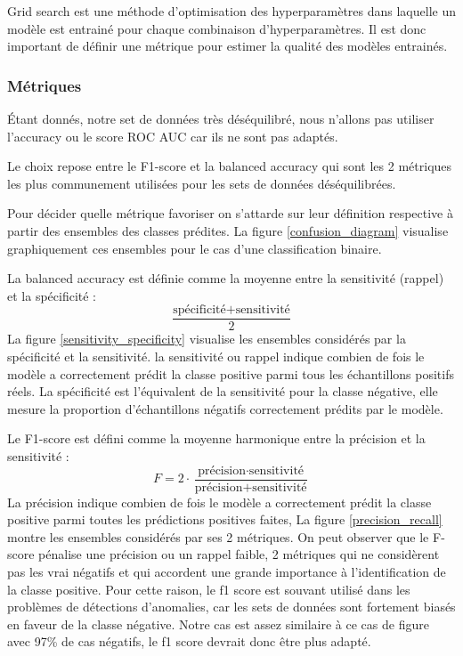 Grid search est une méthode d'optimisation des hyperparamètres dans laquelle un modèle est entrainé pour chaque combinaison d'hyperparamètres.
Il est donc important de définir une métrique pour estimer la qualité des modèles entrainés.
\subsubsection{Métriques}
Étant donnés, notre set de données très déséquilibré, nous n'allons pas utiliser l'accuracy ou le score ROC AUC car ils ne sont pas adaptés.

Le choix repose entre le F1-score et la balanced accuracy qui sont les 2 métriques les plus communement utilisées pour les sets de données déséquilibrées.

Pour décider quelle métrique favoriser on s'attarde sur leur définition respective à partir des ensembles des classes prédites.
La figure \ref{confusion_diagram} visualise graphiquement ces ensembles pour le cas d'une classification binaire.

La balanced accuracy est définie comme la moyenne entre la sensitivité (rappel) et la spécificité :
$$
  \frac{\text{spécificité}+\text{sensitivité}}{2}
$$
La figure \ref{sensitivity_specificity} visualise les ensembles considérés par la spécificité et la sensitivité.
la sensitivité ou rappel indique combien de fois le modèle a correctement prédit la classe positive parmi tous les échantillons positifs réels.
La spécificité est l'équivalent de la sensitivité pour la classe négative, elle mesure la proportion d'échantillons négatifs correctement prédits par le modèle.

Le F1-score est défini comme la moyenne harmonique entre la précision et la sensitivité :
$$
  F=2\cdot\frac{\text{précision} \cdot \text{sensitivité}}{\text{précision} + \text{sensitivité}}
$$
La précision indique combien de fois le modèle a correctement prédit la classe positive parmi toutes les prédictions positives faites,
La figure \ref{precision_recall} montre les ensembles considérés par ses 2 métriques.
On peut observer que le F-score pénalise une précision ou un rappel faible, 2 métriques qui ne considèrent pas les vrai négatifs et qui accordent une grande importance à l'identification de la classe positive.
Pour cette raison, le f1 score est souvant utilisé dans les problèmes de détections d'anomalies, car les sets de données sont fortement biasés en faveur de la classe négative.
Notre cas est assez similaire à ce cas de figure avec 97\% de cas négatifs, le f1 score devrait donc être plus adapté.

